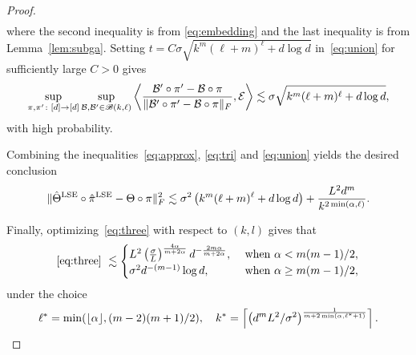 \documentclass[11pt]{article}
\theoremstyle{definition}
\def\caliB{\mathscr{B}}
\begin{document}
\begin{proof}
\begin{align}
\end{align}
where the second inequality is from \eqref{eq:embedding} and the last inequality is from Lemma~\ref{lem:subga}. Setting $t = C\sigma\sqrt{k^m(\ell+m)^\ell + d\log d}$ in~\eqref{eq:union} for sufficiently large $C>0$ gives
\begin{align}\label{eq:union}
    \sup_{\pi, \pi'\colon[d]\to[d]}\sup_{\tB, \tB'\in \caliB(k,\ell)} \left\langle {\tB'\circ \pi'-\tB\circ \pi \over \FnormSize{}{\tB'\circ \pi'-\tB\circ \pi}}, \tE \right \rangle\lesssim \sigma\sqrt{k^m(\ell+m)^\ell +d\log d},
\end{align}
with high probability.

Combining the inequalities~\eqref{eq:approx}, \eqref{eq:tri} and \eqref{eq:union} yields the desired conclusion
\begin{equation}\label{eq:three}
\lVert\hat\Theta^\textup{LSE}\circ\hat\pi^\textup{LSE} -\Theta\circ \pi\rVert_F^2\lesssim \sigma^2\left(k^m(\ell+m)^\ell +d\log d\right)+{L^2d^m \over k^{2\min(\alpha, \ell)}} .
\end{equation}

Finally, optimizing~\eqref{eq:three} with respect to $(k,l)$ gives that 
\begin{align}
     \eqref{eq:three}\ \lesssim 
     \begin{cases} 
    L^2\left({\sigma\over L}\right)^{4\alpha\over m+2\alpha} d^{-\frac{2m\alpha}{m+2\alpha}}, & \text{ when } \alpha < m(m-1)/2,\\
     \sigma^2 d^{-(m-1)}\log d, &\text{ when } \alpha \geq m(m-1)/2,
    \end{cases}
\end{align}
under the choice
\[
\ell^* = \min(\lfloor \alpha\rfloor,(m-2)(m+1)/2),\quad k^* = \left\lceil \left( d^m L^2 /\sigma^2\right)^{1\over m+2\min(\alpha,\ell^*+1)} \right\rceil.
\]

\end{proof}
\end{document}
